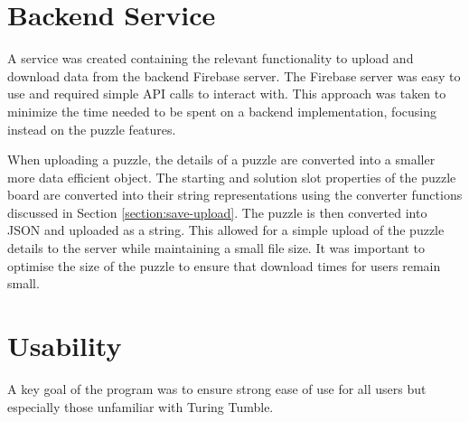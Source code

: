 \documentclass{l4proj}
\begin{document}
\section{Backend Service}
A service was created containing the relevant functionality to upload and download data from the backend Firebase server. The Firebase server was easy to use and required simple API calls to interact with. This approach was taken to minimize the time needed to be spent on a backend implementation, focusing instead on the puzzle features. 


When uploading a puzzle, the details of a puzzle are converted into a smaller more data efficient object. The starting and solution slot properties of the puzzle board are converted into their string representations using the converter functions discussed in Section \ref{section:save-upload}. The puzzle is then converted into JSON and uploaded as a string. This allowed for a simple upload of the puzzle details to the server while maintaining a small file size. It was important to optimise the size of the puzzle to ensure that download times for users remain small. 


\section{Usability}
A key goal of the program was to ensure strong ease of use for all users but especially those unfamiliar with Turing Tumble. 
\end{document}
